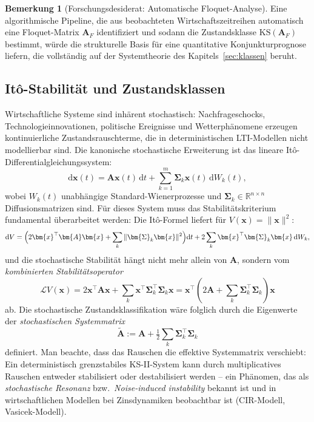 \documentclass[a4paper, 12pt, twoside, openright]{report}
\theoremstyle{definition}
\newtheorem{remark}[theorem]{Bemerkung}
\theoremstyle{definition}
\newcommand{\R}{\mathbb{R}}
\newcommand{\vx}{\bm{x}}
\newcommand{\vA}{\bm{A}}
\newcommand{\vSigma}{\bm{\Sigma}}
\newcommand{\T}{\top}
\newcommand{\KS}{\mathrm{KS}}
\begin{document}
\begin{remark}[Forschungsdesiderat: Automatische Floquet-Analyse]
Eine algorithmische Pipeline, die aus beobachteten Wirtschaftszeitreihen automatisch
eine Floquet-Matrix $\vA_F$ identifiziert und sodann die Zustandsklasse $\KS(\vA_F)$
bestimmt, würde die strukturelle Basis für eine quantitative Konjunkturprognose
liefern, die vollständig auf der Systemtheorie des Kapitels~\ref{sec:klassen}
beruht.
\end{remark}

\subsection{Itô-Stabilität und Zustandsklassen}
\label{subsec:stochastisch}

Wirtschaftliche Systeme sind inhärent stochastisch: Nachfrageschocks,
Technologieinnovationen, politische Ereignisse und Wetterphänomene erzeugen
kontinuierliche Zustandsrauschterme, die in deterministischen LTI-Modellen nicht
modellierbar sind. Die kanonische stochastische Erweiterung ist das lineare
Itô-Differentialgleichungssystem:
\begin{equation}
  \mathrm{d}\vx(t) = \vA\vx(t)\,\mathrm{d}t + \sum_{k=1}^m \vSigma_k\vx(t)\,\mathrm{d}W_k(t),
  \label{eq:ito_system}
\end{equation}
wobei $W_k(t)$ unabhängige Standard-Wienerprozesse und $\vSigma_k \in \R^{n \times n}$
Diffusionsmatrizen sind. Für dieses System muss das Stabilitätskriterium fundamental
überarbeitet werden: Die Itô-Formel liefert für $V(\vx) = \|\vx\|^2$:
\begin{equation}
  \mathrm{d}V = \Bigl(2\vx^\T\vA\vx + \sum_k \|\vSigma_k\vx\|^2\Bigr)\mathrm{d}t
    + 2\sum_k \vx^\T\vSigma_k\vx\,\mathrm{d}W_k,
  \label{eq:ito_formel}
\end{equation}
und die stochastische Stabilität hängt nicht mehr allein von $\vA$, sondern vom
\emph{kombinierten Stabilitätsoperator}
\begin{equation}
  \mathcal{L}V(\vx) = 2\vx^\T\vA\vx + \sum_k \vx^\T\vSigma_k^\T\vSigma_k\vx
  = \vx^\T\!\left(2\vA + \sum_k \vSigma_k^\T\vSigma_k\right)\!\vx
  \label{eq:stabop}
\end{equation}
ab. Die stochastische Zustandsklassifikation wäre folglich durch die Eigenwerte der
\emph{stochastischen Systemmatrix}
\begin{equation}
  \tilde{\vA} := \vA + \tfrac{1}{2}\sum_k \vSigma_k^\T\vSigma_k
  \label{eq:stoch_sysmat}
\end{equation}
definiert. Man beachte, dass das Rauschen die effektive Systemmatrix verschiebt: Ein
deterministisch grenzstabiles KS-II-System kann durch multiplicatives Rauschen
entweder stabilisiert oder destabilisiert werden -- ein Phänomen, das als
\emph{stochastische Resonanz} bzw.~\emph{Noise-induced instability} bekannt ist und
in wirtschaftlichen Modellen bei Zinsdynamiken beobachtbar ist (CIR-Modell, Vasicek-Modell).
\end{document}
